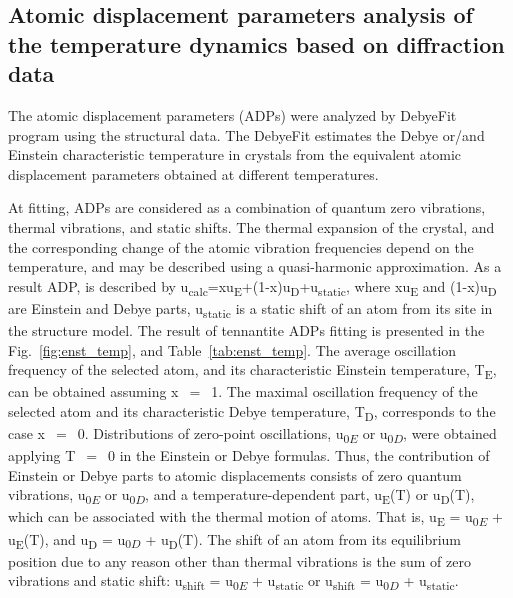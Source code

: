 \documentclass[preprint,review,12pt]{elsarticle}
\begin{document}
\subsection{Atomic displacement parameters analysis of the temperature dynamics based on diffraction data}\label{sec:level2}

The atomic displacement parameters (ADPs) were analyzed by DebyeFit program using the structural data.
The DebyeFit estimates the Debye or/and Einstein characteristic temperature in crystals from the equivalent atomic displacement parameters obtained at different temperatures.

At fitting, ADPs are considered as a combination of quantum zero vibrations, thermal vibrations, and static shifts\cite{Trueblood1996,Bentien2005,Nakatsuka2011}.
The thermal expansion of the crystal, and the corresponding change of the atomic vibration frequencies depend on the temperature, and may be described using a quasi-harmonic approximation\cite{willis1975thermal,Bentien2005}.
As a result ADP, is described by u\textsubscript{calc}=xu\textsubscript{E}+(1-x)u\textsubscript{D}+u\textsubscript{static}, where xu\textsubscript{E} and (1-x)u\textsubscript{D} are Einstein and Debye parts, u\textsubscript{static} is a static shift of an atom from its site in the structure model\cite{Dudka2019}.
The result of tennantite ADPs fitting is presented in the Fig.~\ref{fig:enst_temp}, and Table~\ref{tab:enst_temp}.
The average oscillation frequency of the selected atom, and its characteristic Einstein temperature, T\textsubscript{E}, can be obtained  assuming x~$=$~1.
The maximal oscillation frequency of the selected atom and its characteristic Debye temperature, T\textsubscript{D}, corresponds to the case x~$=$~0.
Distributions of zero-point oscillations, u\textsubscript{$0E$} or u\textsubscript{$0D$}, were obtained applying T~$=$~0 in the Einstein or Debye formulas.
Thus, the contribution of Einstein or Debye parts to atomic displacements consists of zero quantum vibrations, u\textsubscript{$0E$} or u\textsubscript{$0D$}, and a temperature-dependent part, u\textsubscript{E}(T) or u\textsubscript{D}(T), which can be associated with the thermal motion of atoms.
That is, u\textsubscript{E} = u\textsubscript{$0E$} + u\textsubscript{E}(T), and u\textsubscript{D} = u\textsubscript{$0D$} + u\textsubscript{D}(T). The shift of an atom from its equilibrium position due to any reason other than thermal vibrations is the sum of zero vibrations and static shift: u\textsubscript{shift} = u\textsubscript{$0E$} + u\textsubscript{static} or u\textsubscript{shift} = u\textsubscript{$0D$} + u\textsubscript{static}\cite{Dudka2019}.
\end{document}
